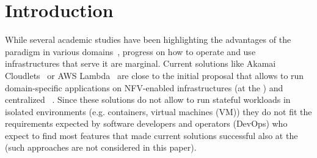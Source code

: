 \vspace*{-.2cm}
\section{Introduction}
\label{sec:intro}

\vspace*{-.1cm}


While several academic studies have been highlighting the advantages
of the \edgecomputing paradigm in various
domains~\cite{bonomi2012fog,satyanarayanan2017emergence,shi2016edge,yi2015fog,zhang2015cloud},
progress on how to operate and use infrastructures that serve it are marginal.
Current solutions like Akamai Cloudlets~\cite{akamai:cloudlets} or
AWS Lambda~\cite{amazon:lambda-edge} are close to the initial \fog proposal that
allows to run domain-specific applications on NFV-enabled infrastructures (at
the \edge) and centralized \clouds~\cite{bonomi2012fog}.
%
Since these solutions do not allow to run stateful workloads in isolated
environments (e.g. containers, virtual machines (VM)) they do not fit the
requirements expected by software developers and operators (DevOps) who expect
to find most features that made current \cloudcomputing solutions successful
also at the \edge (such approaches are not considered in this paper).


